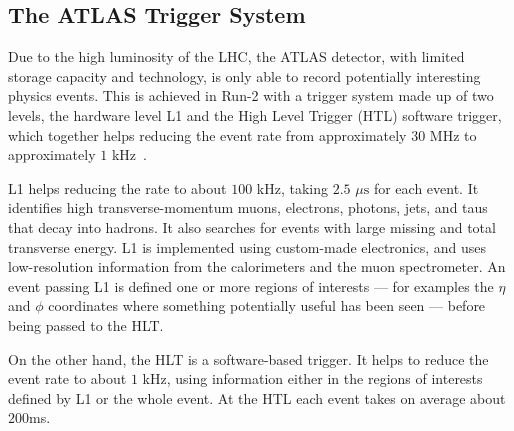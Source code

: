 \subsection{The ATLAS Trigger System}

Due to the high luminosity of the LHC, the ATLAS detector, with limited storage
capacity and technology, is only able to record potentially interesting physics
events. This is achieved in Run-2 with a trigger system made up of two levels,
the hardware level L1 and the High Level Trigger (HTL) software trigger, which
together helps reducing the event rate from approximately $30$ MHz to
approximately $1$ kHz~\cite{atlastrigger}.

L1 helps reducing the rate to about $100$ kHz, taking $2.5$ $\mu\text{s}$
for each event. It identifies high transverse-momentum muons, electrons,
photons, jets, and taus that decay into hadrons. It also searches for events
with large missing and total transverse energy. L1 is implemented using
custom-made electronics, and uses low-resolution information from the
calorimeters and the muon spectrometer. An event passing L1 is defined one or
more regions of interests --- for examples the $\eta$ and $\phi$ coordinates
where something potentially useful has been seen --- before being passed to the
HLT.

On the other hand, the HLT is a software-based trigger. It helps to reduce the
event rate to about $1$ kHz, using information either in the regions of
interests defined by L1 or the whole event. At the HTL each event takes on
average about $200$ms.





